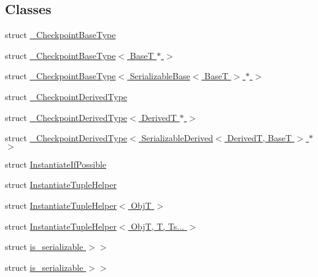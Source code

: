 \subsection*{Classes}
\begin{DoxyCompactItemize}
\item 
struct \hyperlink{structcheckpoint_1_1dispatch_1_1vrt_1_1___checkpoint_base_type}{\+\_\+\+Checkpoint\+Base\+Type}
\item 
struct \hyperlink{structcheckpoint_1_1dispatch_1_1vrt_1_1___checkpoint_base_type_3_01_base_t_01_5_01_4}{\+\_\+\+Checkpoint\+Base\+Type$<$ Base\+T $\ast$ $>$}
\item 
struct \hyperlink{structcheckpoint_1_1dispatch_1_1vrt_1_1___checkpoint_base_type_3_01_serializable_base_3_01_base_t_01_4_01_5_01_4}{\+\_\+\+Checkpoint\+Base\+Type$<$ Serializable\+Base$<$ Base\+T $>$ $\ast$ $>$}
\item 
struct \hyperlink{structcheckpoint_1_1dispatch_1_1vrt_1_1___checkpoint_derived_type}{\+\_\+\+Checkpoint\+Derived\+Type}
\item 
struct \hyperlink{structcheckpoint_1_1dispatch_1_1vrt_1_1___checkpoint_derived_type_3_01_derived_t_01_5_01_4}{\+\_\+\+Checkpoint\+Derived\+Type$<$ Derived\+T $\ast$ $>$}
\item 
struct \hyperlink{structcheckpoint_1_1dispatch_1_1vrt_1_1___checkpoint_derived_type_3_01_serializable_derived_3_0142c576e50eb568281bb6c0a86d22e7e8}{\+\_\+\+Checkpoint\+Derived\+Type$<$ Serializable\+Derived$<$ Derived\+T, Base\+T $>$ $\ast$ $>$}
\item 
struct \hyperlink{structcheckpoint_1_1dispatch_1_1vrt_1_1_instantiate_if_possible}{Instantiate\+If\+Possible}
\item 
struct \hyperlink{structcheckpoint_1_1dispatch_1_1vrt_1_1_instantiate_tuple_helper}{Instantiate\+Tuple\+Helper}
\item 
struct \hyperlink{structcheckpoint_1_1dispatch_1_1vrt_1_1_instantiate_tuple_helper_3_01_obj_t_01_4}{Instantiate\+Tuple\+Helper$<$ Obj\+T $>$}
\item 
struct \hyperlink{structcheckpoint_1_1dispatch_1_1vrt_1_1_instantiate_tuple_helper_3_01_obj_t_00_01_t_00_01_ts_8_8_8_01_4}{Instantiate\+Tuple\+Helper$<$ Obj\+T, T, Ts... $>$}
\item 
struct \hyperlink{structcheckpoint_1_1dispatch_1_1vrt_1_1_instantiate_if_possible_3_01_obj_t_00_01_serializer_t_00e6cea7afc6d3212786593c9e3a69da69}{is\+\_\+serializable $>$$>$}
\item 
struct \hyperlink{structcheckpoint_1_1dispatch_1_1vrt_1_1_instantiate_if_possible_3_01_obj_t_00_01_serializer_t_00f2328765646be8355fd88552c7d20478}{is\+\_\+serializable $>$$>$}

\end{DoxyCompactItemize}
